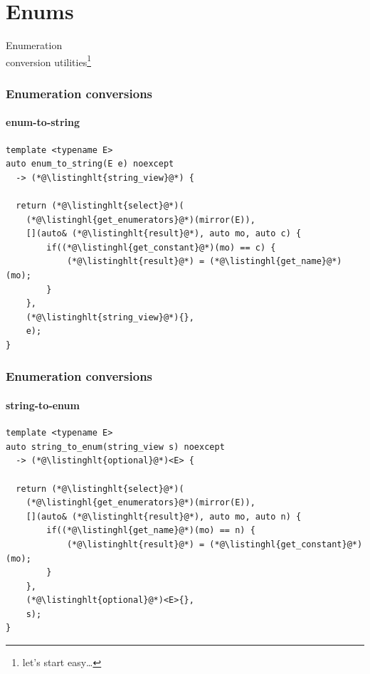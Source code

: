 \documentclass[compress,table,xcolor=table]{beamer}
\begin{document}
\section{Enums}
\begin{frame}[c]
  \Huge
  \centering
  Enumeration\\
  \large
  conversion utilities\footnote{let's start easy\ldots}
\end{frame}
\begin{frame}[fragile]
  \frametitle{Enumeration conversions}
  \framesubtitle{enum-to-string}
  \begin{lstlisting}[language=c++2x]
template <typename E>
auto enum_to_string(E e) noexcept
  -> (*@\listinghlt{string_view}@*) {

  return (*@\listinghlt{select}@*)(
    (*@\listinghl{get_enumerators}@*)(mirror(E)),
    [](auto& (*@\listinghlt{result}@*), auto mo, auto c) {
        if((*@\listinghl{get_constant}@*)(mo) == c) {
            (*@\listinghlt{result}@*) = (*@\listinghl{get_name}@*)(mo);
        }
    },
    (*@\listinghlt{string_view}@*){},
    e);
}
  \end{lstlisting}
\end{frame}
\begin{frame}[fragile]
  \frametitle{Enumeration conversions}
  \framesubtitle{string-to-enum}
  \begin{lstlisting}[language=c++2x]
template <typename E>
auto string_to_enum(string_view s) noexcept
  -> (*@\listinghlt{optional}@*)<E> {

  return (*@\listinghlt{select}@*)(
    (*@\listinghl{get_enumerators}@*)(mirror(E)),
    [](auto& (*@\listinghlt{result}@*), auto mo, auto n) {
        if((*@\listinghl{get_name}@*)(mo) == n) {
            (*@\listinghlt{result}@*) = (*@\listinghl{get_constant}@*)(mo);
        }
    },
    (*@\listinghlt{optional}@*)<E>{},
    s);
}
  \end{lstlisting}
\end{frame}
\end{document}
